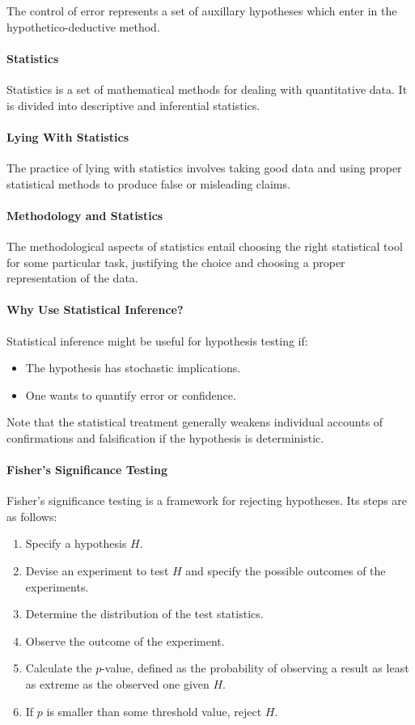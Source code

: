 The control of error represents a set of auxillary hypotheses which enter in the hypothetico-deductive method.

\paragraph{Statistics}
Statistics is a set of mathematical methods for dealing with quantitative data. It is divided into descriptive and inferential statistics.

\paragraph{Lying With Statistics}
The practice of lying with statistics involves taking good data and using proper statistical methods to produce false or misleading claims.

\paragraph{Methodology and Statistics}
The methodological aspects of statistics entail choosing the right statistical tool for some particular task, justifying the choice and choosing a proper representation of the data.

\paragraph{Why Use Statistical Inference?}
Statistical inference might be useful for hypothesis testing if:
\begin{itemize}
	\item The hypothesis has stochastic implications.
	\item One wants to quantify error or confidence.
\end{itemize}

Note that the statistical treatment generally weakens individual accounts of confirmations and falsification if the hypothesis is deterministic.

\paragraph{Fisher's Significance Testing}
Fisher's significance testing is a framework for rejecting hypotheses. Its steps are as follows:

\begin{enumerate}
	\item Specify a hypothesis $H$.
	\item Devise an experiment to test $H$ and specify the possible outcomes of the experiments.
	\item Determine the distribution of the test statistics.
	\item Observe the outcome of the experiment.
	\item Calculate the $p$-value, defined as the probability of observing a result as least as extreme as the observed one given $H$.
	\item If $p$ is smaller than some threshold value, reject $H$.
\end{enumerate}

